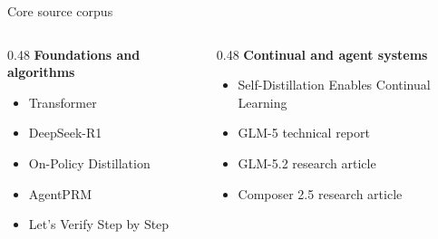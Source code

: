 \begin{frame}{Core source corpus}
  \small
  \begin{columns}[T]
    \begin{column}{0.48\textwidth}
      \textbf{Foundations and algorithms}
      \begin{itemize}
        \item Transformer
        \item DeepSeek-R1
        \item On-Policy Distillation
        \item AgentPRM
        \item Let's Verify Step by Step
      \end{itemize}
    \end{column}
    \begin{column}{0.48\textwidth}
      \textbf{Continual and agent systems}
      \begin{itemize}
        \item Self-Distillation Enables Continual Learning
        \item GLM-5 technical report
        \item GLM-5.2 research article
        \item Composer 2.5 research article
      \end{itemize}
    \end{column}
  \end{columns}
\end{frame}
